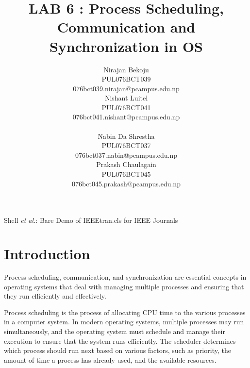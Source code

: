 \documentclass[journal,onecolumn]{IEEEtran}
\begin{document}
\title{LAB 6 : Process Scheduling, Communication and Synchronization in OS}

\author{
  \begin{multicols}{2}
    \centering
    Nirajan Bekoju\\
    PUL076BCT039\\
    076bct039.nirajan@pcampus.edu.np\\
    \columnbreak
    Nishant Luitel\\
    PUL076BCT041 \\
    076bct041.nishant@pcampus.edu.np \\
  \end{multicols}
  \begin{multicols}{2}
    \centering
    Nabin Da Shrestha\\
    PUL076BCT037 \\
    076bct037.nabin@pcampus.edu.np \\
    \columnbreak
    Prakash Chaulagain \\
    PUL076BCT045 \\
    076bct045.prakash@pcampus.edu.np
  \end{multicols}
}

%
{Shell \MakeLowercase{\textit{et al.}}: Bare Demo of IEEEtran.cls for IEEE Journals}

\maketitle

\IEEEpeerreviewmaketitle

\section{Introduction}
Process scheduling, communication, and synchronization are essential concepts in operating systems that deal with managing multiple processes and ensuring that they run efficiently and effectively.

Process scheduling is the process of allocating CPU time to the various processes in a computer system. In modern operating systems, multiple processes may run simultaneously, and the operating system must schedule and manage their execution to ensure that the system runs efficiently. The scheduler determines which process should run next based on various factors, such as priority, the amount of time a process has already used, and the available resources.
\end{document}
